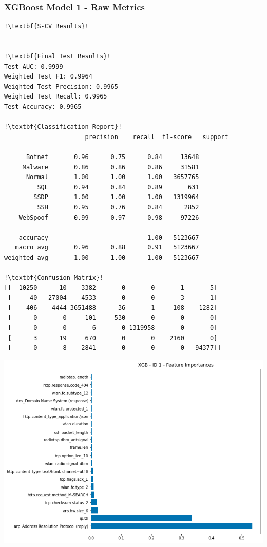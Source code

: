 \begin{appendices}
\subsubsection{XGBoost Model 1 - Raw Metrics}
\begin{lstlisting}[escapechar=!]
!\textbf{S-CV Results}!


!\textbf{Final Test Results}!
Test AUC: 0.9999
Weighted Test F1: 0.9964
Weighted Test Precision: 0.9965
Weighted Test Recall: 0.9965
Test Accuracy: 0.9965

!\textbf{Classification Report}!
			          precision    recall  f1-score   support

      Botnet       0.96      0.75      0.84     13648
     Malware       0.86      0.86      0.86     31581
      Normal       1.00      1.00      1.00   3657765
         SQL       0.94      0.84      0.89       631
        SSDP       1.00      1.00      1.00   1319964
         SSH       0.95      0.76      0.84      2852
    WebSpoof       0.99      0.97      0.98     97226

    accuracy                           1.00   5123667
   macro avg       0.96      0.88      0.91   5123667
weighted avg       1.00      1.00      1.00   5123667
    
!\textbf{Confusion Matrix}!    
[[  10250      10    3382       0       0       1       5]
 [     40   27004    4533       0       0       3       1]
 [    406    4444 3651488      36       1     108    1282]
 [      0       0     101     530       0       0       0]
 [      0       0       6       0 1319958       0       0]
 [      3      19     670       0       0    2160       0]
 [      0       8    2841       0       0       0   94377]]

\end{lstlisting}

\begin{center}
	\centering
	\includegraphics[width=\textwidth]{Appendices/Images/XGB/Model1/XGB_Model1_FI.png}
\end{center}


\end{appendices}
